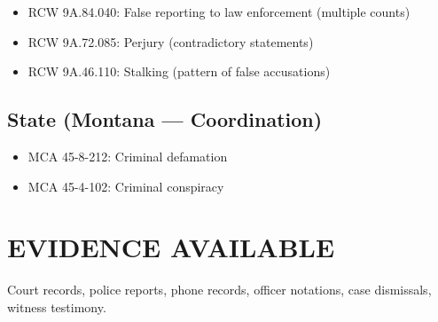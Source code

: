 \documentclass[12pt,oneside]{article}
\begin{document}
\begin{itemize}

\item RCW 9A.84.040: False reporting to law enforcement (multiple counts)

\item RCW 9A.72.085: Perjury (contradictory statements)

\item RCW 9A.46.110: Stalking (pattern of false accusations)

\end{itemize}

\subsection*{State (Montana --- Coordination)}

\begin{itemize}

\item MCA 45-8-212: Criminal defamation

\item MCA 45-4-102: Criminal conspiracy

\end{itemize}

\section*{EVIDENCE AVAILABLE}

Court records, police reports, phone records, officer notations, case dismissals, witness testimony.
\end{document}
